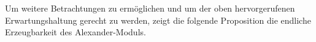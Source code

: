 


     Um weitere Betrachtungen zu ermöglichen und um der oben hervorgerufenen Erwartungshaltung gerecht zu werden, zeigt die folgende Proposition die endliche Erzeugbarkeit des Alexander-Moduls.


